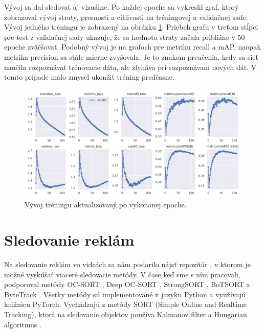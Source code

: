 Vývoj sa dal sledovať aj vizuálne. Po každej epoche sa vykreslil graf, ktorý zobrazoval vývoj straty, presnosti a citlivosti na tréningovej a validačnej sade. Vývoj jedného tréningu je zobrazený na obrázku \ref{img:graf}. Priebeh grafu v treťom stĺpci pre test z validačnej sady ukazuje, že sa hodnota straty začala približne v 50 epoche zväčšovať. Podobný vývoj je na grafoch pre metriku recall a mAP, naopak metrika precision sa stále mierne zvyšovala. Je to znakom preučenia, kedy sa sieť naučila rozpoznávať trénovacie dáta, ale zlyháva pri rozpoznávaní nových dát. V tomto prípade malo zmysel ukonžiť tréning predčasne.
\\
\begin{figure}[ht]
    \centering
    \includegraphics[width=1\textwidth]{images/04/graf.png}
    \caption{Vývoj tréningu aktualizovaný po vykonanej epoche.}
    \label{img:graf}
\end{figure}


\section{Sledovanie reklám}

Na sledovanie reklám vo videách sa nám podarilo nájsť repozitár \cite{mikel}, v ktorom je možné vyskúšať viaceré sledovacie metódy. V čase keď sme s ním pracovali, podporoval metódy OC-SORT \cite{ocsort}, Deep OC-SORT \cite{deepocsort}, StrongSORT \cite{strongsort}, BoTSORT \cite{bot} a ByteTrack \cite{bytetrack}. Všetky metódy sú implementované v jazyku Python a využívajú knižnicu PyTorch. Vychádzajú z metódy SORT (Simple Online and Realtime Tracking), ktorá na sledovanie objektov používa Kalmanov filter a Hungarian algoritmus \cite{sort}.

